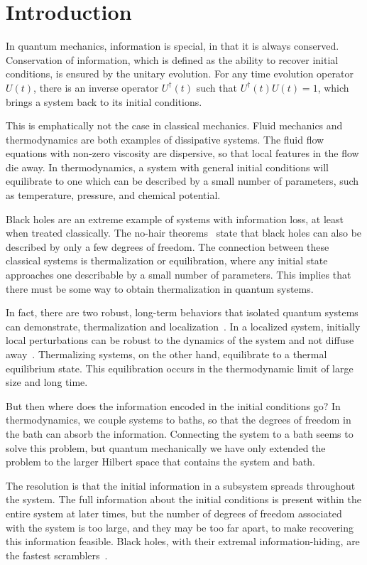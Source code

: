\section{Introduction} \label{sec:intro}

In quantum mechanics, information is special, in that it is always conserved. Conservation of information, which is defined as the ability to recover initial conditions, is ensured by the unitary evolution. For any time evolution operator $U(t)$, there is an inverse operator $U^\dag(t)$ such that $U^\dag(t)U(t)=1$, which brings a system back to its initial conditions. 

This is emphatically not the case in classical mechanics. Fluid mechanics and thermodynamics are both examples of dissipative systems. The fluid flow equations with non-zero viscosity are dispersive, so that local features in the flow die away. In thermodynamics, a system with general initial conditions will equilibrate to one which can be described by a small number of parameters, such as temperature, pressure, and chemical potential.

Black holes are an extreme example of systems with information loss, at least when treated classically. The no-hair theorems~\cite{Israel1967, Israel1968, Carter71} state that black holes can also be described by only a few degrees of freedom. The connection between these classical systems is thermalization or equilibration, where any initial state approaches one describable by a small number of parameters. This implies that there must be some way to obtain thermalization in quantum systems.

In fact, there are two robust, long-term behaviors that isolated quantum systems can demonstrate, thermalization and localization~\cite{Nandkishore2015}. In a localized system, initially local perturbations can be robust to the dynamics of the system and not diffuse away~\cite{Anderson58}. Thermalizing systems, on the other hand, equilibrate to a thermal equilibrium state. This equilibration occurs in the thermodynamic limit of large size and long time. 

But then where does the information encoded in the initial conditions go? In thermodynamics, we couple systems to baths, so that the degrees of freedom in the bath can absorb the information. Connecting the system to a bath seems to solve this problem, but quantum mechanically we have only extended the problem to the larger Hilbert space that contains the system and bath. 

The resolution is that the initial information in a subsystem spreads throughout the system. The full information about the initial conditions is present within the entire system at later times, but the number of degrees of freedom associated with the system is too large, and they may be too far apart, to make recovering this information feasible. Black holes, with their extremal information-hiding, are the fastest scramblers~\cite{Sekino2008, Maldacena2016}.

